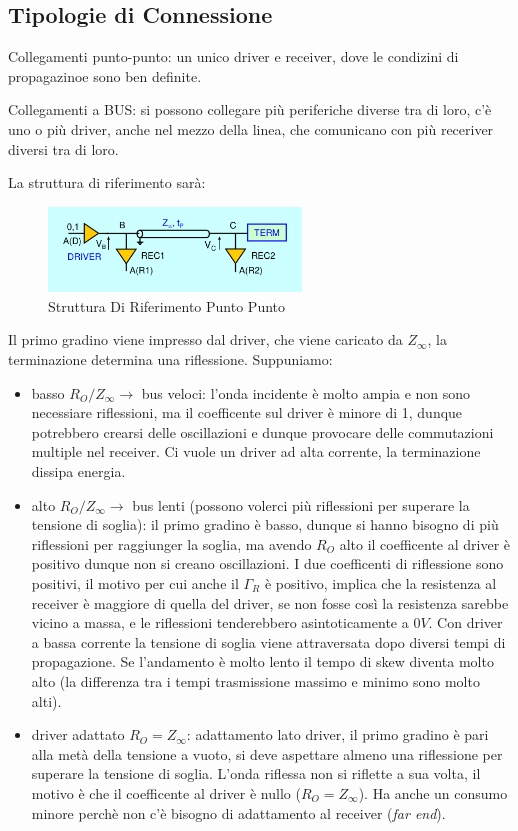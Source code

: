 \documentclass[12pt]{article}
\begin{document}
\subsection{Tipologie di Connessione}
Collegamenti punto-punto: un unico driver e receiver, dove le condizini di propagazinoe sono ben definite.

Collegamenti a BUS: si possono collegare pi\`u periferiche diverse tra di loro, c'\`e uno o pi\`u driver, anche nel mezzo della linea, che comunicano con pi\`u receriver diversi tra di loro.

La struttura di riferimento sar\`a:
\begin{figure}[H]
    \centering
    \includegraphics[width=0.6\textwidth]{struttura-di-riferimento-punto-punto.png}
    \caption{Struttura Di Riferimento Punto Punto}
    \label{fig:struttura-di-riferimento-punto-punto}
\end{figure}
Il primo gradino viene impresso dal driver, che viene caricato da $Z _{\infty}$, la terminazione determina una riflessione. Suppuniamo:
\begin{itemize}
    \item basso $R_O/Z _{\infty} \to$ bus veloci: l'onda incidente \`e molto ampia e non sono necessiare riflessioni, ma il coefficente sul driver \`e minore di 1, dunque potrebbero crearsi delle oscillazioni e dunque provocare delle commutazioni multiple nel receiver. Ci vuole un driver ad alta corrente, la terminazione dissipa energia.
    \item alto $R_O/Z _{\infty} \to$ bus lenti (possono volerci pi\`u riflessioni per superare la tensione di soglia): il primo gradino \`e basso, dunque si hanno bisogno di pi\`u riflessioni per raggiunger la soglia, ma avendo $R_O$ alto il coefficente al driver \`e positivo dunque non si creano oscillazioni. I due coefficenti di riflessione sono positivi, il motivo per cui anche il $\Gamma_R$ \`e positivo, implica che la resistenza al receiver \`e maggiore di quella del driver, se non fosse cos\`i la resistenza sarebbe vicino a massa, e le riflessioni tenderebbero asintoticamente a $0V$. Con driver a bassa corrente la tensione di soglia viene attraversata dopo diversi tempi di propagazione. Se l'andamento \`e molto lento il tempo di skew diventa molto alto (la differenza tra i tempi trasmissione massimo e minimo sono molto alti).
    \item driver adattato $R_O = Z _{\infty}$: adattamento lato driver, il primo gradino \`e pari alla met\`a della tensione a vuoto, si deve aspettare almeno una riflessione per superare la tensione di soglia. L'onda riflessa non si riflette a sua volta, il motivo \`e che il coefficente al driver \`e nullo ($R_O = Z _{\infty}$). Ha anche un consumo minore perch\`e non c'\`e bisogno di adattamento al receiver (\emph{far end}).
\end{itemize}
\end{document}
